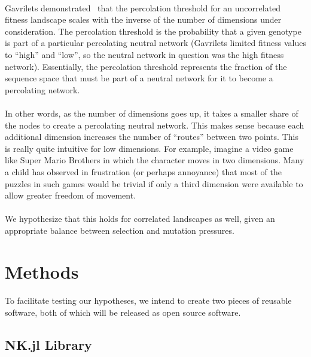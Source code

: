 \documentclass[12pt,letterpaper,titlepage]{article}
\begin{document}
\paragraph{}
Gavrilets demonstrated~\cite{Gavrilets1997} that the percolation threshold for
an uncorrelated fitness landscape scales with the inverse of the number of
dimensions under consideration. The percolation threshold is the probability
that a given genotype is part of a particular percolating neutral network
(Gavrilets limited fitness values to ``high'' and ``low'', so the neutral
network in question was the high fitness network). Essentially, the percolation
threshold represents the fraction of the sequence space that must be part of a
neutral network for it to become a percolating network.

\paragraph{}
In other words, as the number of dimensions goes up, it takes a smaller share
of the nodes to create a percolating neutral network. This makes sense because
each additional dimension increases the number of ``routes'' between two
points. This is really quite intuitive for low dimensions. For example, imagine
a video game like Super Mario Brothers in which the character moves in two
dimensions. Many a child has observed in frustration (or perhaps annoyance)
that most of the puzzles in such games would be trivial if only a third
dimension were available to allow greater freedom of movement.

\paragraph{}
We hypothesize that this holds for correlated landscapes as well, given an
appropriate balance between selection and mutation pressures.

\section{Methods}

\paragraph{}
To facilitate testing our hypotheses, we intend to create two pieces of
reusable software, both of which will be released as open source software.

\subsection{NK.jl Library}
\end{document}
